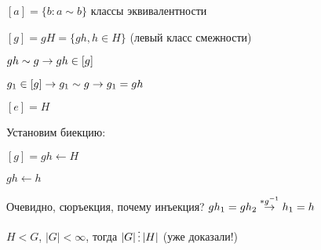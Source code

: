 \documentclass[main]{subfiles}
\begin{document}
  \begin{definition}
      $[a] = \{b:a  \sim b\}$ классы эквивалентности
  \end{definition}

  \begin{definition}
      $[g] = g H = \{g h, h \in H \}$ (левый класс смежности)

      $g h \sim g \rightarrow g h \in [g]$

      $g_1 \in [g] \rightarrow g_1 \sim g \rightarrow g_1 = g h$
  \end{definition}

  \begin{utv}
      $[e]=H$

      Установим биекцию:

      $[g]=gh \leftarrow H$

      $gh \leftarrow h$

      Очевидно, сюръекция, почему инъекция? $g h_1 = g h_2 \overset{*g^{-1}}{\rightarrow} h_1 = h$
  \end{utv}

  \begin{theorem}[Лагранжа]
  $H < G$, $|G| < \infty$, тогда $|G| \devides |H|$ (уже доказали!)
  \end{theorem}
\end{document}
